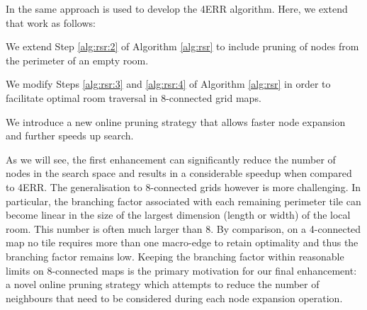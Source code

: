 In \cite{harabor10} the same approach is used to develop the 4ERR algorithm.
Here, we extend that work as follows:
\begin{enumerate}
\item{
We extend Step \ref{alg:rsr:2} of Algorithm \ref{alg:rsr} 
to include pruning of nodes from the perimeter of an empty room.
}
\item{
We modify Steps \ref{alg:rsr:3} and \ref{alg:rsr:4} of Algorithm
\ref{alg:rsr} in order to facilitate optimal room traversal in 8-connected grid
maps. 
\item{We introduce a new online pruning strategy that allows faster node
expansion and further speeds up search.}
}
\end{enumerate}
As we will see, the first enhancement can significantly reduce the number of nodes
in the search space and results in a considerable speedup when compared to 4ERR.
The generalisation to 8-connected grids however is more challenging.
In particular, the branching factor associated with each remaining perimeter tile 
can become linear in the size of the largest dimension (length or width) of the local room. 
This number is often much larger than 8. 
By comparison, on a 4-connected map no tile requires more than one macro-edge 
to retain optimality and thus the branching factor remains low.
Keeping the branching factor within reasonable limits on 8-connected maps
is the primary motivation
for our final enhancement: a novel online pruning strategy which attempts to
reduce the number of neighbours that need to be considered during each node 
expansion operation.
